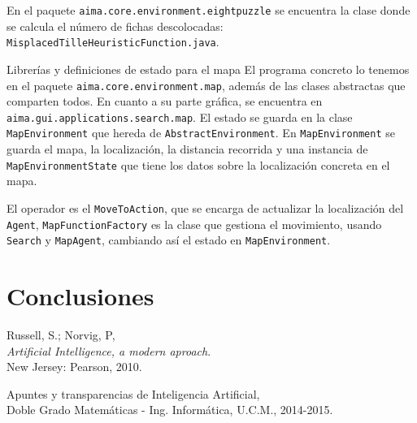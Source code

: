 \documentclass[11pt, a4paper, spanish, openright, twoside]{book}
\begin{document}
En el paquete \texttt{aima.core.environment.eightpuzzle} se encuentra la clase donde se calcula el número de fichas descolocadas: \texttt{MisplacedTilleHeuristicFunction.java}.



\begin{section}{Librerías y definiciones de estado para el mapa }
	El programa concreto lo tenemos en el paquete \texttt{aima.core.environment.map}, además de las clases abstractas que comparten todos. En cuanto a su parte gráfica, se encuentra en \texttt{aima.gui.applications.search.map}. El estado se guarda en la clase 
	\texttt{MapEnvironment} que hereda de \texttt{AbstractEnvironment}. En \texttt{MapEnvironment} se guarda el mapa, la localización, la distancia recorrida y una instancia de \texttt{MapEnvironmentState} que tiene los datos sobre la localización concreta en el mapa.
	
	El operador es el \texttt{MoveToAction}, que se encarga de actualizar la localización del \texttt{Agent}, \texttt{MapFunctionFactory} es la clase que gestiona el movimiento, usando \texttt{Search} y \texttt{MapAgent}, cambiando así el estado en \texttt{MapEnvironment}.

\end{section}

	
\section{Conclusiones}


	
\begin{thebibliography}{9}

	Russell, S.; Norvig, P, \\
	\emph{Artificial Intelligence, a modern aproach}.\\
	New Jersey: Pearson, 2010.
	
	Apuntes y transparencias de Inteligencia Artificial, \\
	Doble Grado Matemáticas - Ing. Informática, U.C.M., 2014-2015.

\end{thebibliography}
\end{document}

